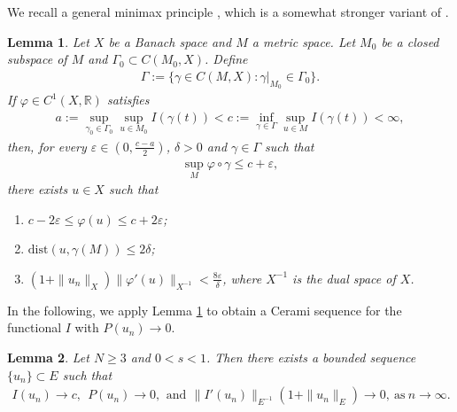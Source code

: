 \documentclass[12pt,a4paper,reqno]{amsart}
\numberwithin{equation}{section}
\newtheorem{lemma}{Lemma}[section]
\begin{document}
We recall a general minimax principle
\cite[Proposition 2.8]{LiGB-WangCH2011AFM},
which is a somewhat stronger variant of \cite[Theorem 2.8]{Willem1996Book}.
\begin{lemma}\label{Lemma5.6}
Let $X$ be a Banach space and $M$ a metric space. Let $M_{0}$ be a closed subspace of $M$ and $\Gamma_{0}\subset C(M_{0},X)$.
Define
\begin{equation*}
\begin{aligned}
\Gamma:=\{\gamma\in C(M,X):\gamma|_{M_{0}}\in\Gamma_{0}\}.
\end{aligned}
\end{equation*}
If $\varphi\in C^{1}(X,\mathbb{R})$ satisfies
\begin{equation*}
\begin{aligned}
a:=\sup\limits_{\gamma_{0}\in \Gamma_{0}}\sup\limits_{u\in M_{0}}I(\gamma (t))
<
c:=\inf\limits_{\gamma\in \Gamma}\sup\limits_{u\in M}I(\gamma (t))<\infty,
\end{aligned}
\end{equation*}
then, for every $\varepsilon\in(0,\frac{c-a}{2})$,
$\delta>0$
and
$\gamma\in\Gamma$ such that
\begin{equation*}
\begin{aligned}
\sup\limits_{M}\varphi\circ\gamma\leqslant c+\varepsilon,
\end{aligned}
\end{equation*}
there exists $u\in X$ such that
\begin{enumerate}
\item [(i)] $c-2\varepsilon \leqslant \varphi(u)\leqslant c+2\varepsilon$;

\item [(ii)]
$\mathrm{dist}(u,\gamma(M))\leqslant 2\delta$;

\item [(iii)]
$(1+\|u_{n}\|_{X})\|\varphi'(u)\|_{X^{-1}}<\frac{8\varepsilon}{\delta}$, where $X^{-1}$ is the dual space of $X$.
\end{enumerate}
\end{lemma}
In the following, we apply Lemma \ref{Lemma5.6} to obtain a Cerami sequence for the functional $I$ with $P(u_{n})\to0$.

\begin{lemma}\label{Lemma5.7}
Let $N\geqslant3$ and $0<s<1$.
Then there exists a bounded sequence $\{u_{n}\}\subset E$ such that
\begin{equation*}
\begin{aligned}
I(u_{n})\rightarrow c,\ \
P(u_{n})\rightarrow 0,
\ \,\mathrm{and}\ \,
\|I'(u_{n})\|_{E^{-1}}(1+\|u_{n}\|_{E})\rightarrow 0,\ \mathrm{as}\ n\rightarrow \infty.
\end{aligned}
\end{equation*}
\end{lemma}
\end{document}
